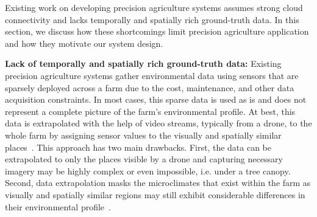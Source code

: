 Existing work on developing precision agriculture systems assumes strong cloud connectivity and lacks temporally and spatially rich ground-truth data. 
In this section, we discuss how these shortcomings limit precision agriculture application and how they motivate our system design. 


\noindent
\textbf{Lack of temporally and spatially rich ground-truth data:}
Existing precision agriculture systems gather environmental data using sensors that are sparsely deployed across a farm due to the cost, maintenance, and other data acquisition constraints. In most cases, this sparse data is used as is and  does not represent a complete picture of the farm's environmental profile.  At best, this data is extrapolated with the help of video streams, typically from a drone, to the whole farm by assigning sensor values to the visually and spatially similar places~\cite{vasisht2017farmbeats}. This approach has two main drawbacks. First, the data can be extrapolated to only the places visible by a drone and capturing necessary imagery may be highly complex or even impossible, i.e. under a tree canopy. Second, data extrapolation masks the microclimates that exist within the farm as visually and spatially similar regions may still exhibit considerable differences in their environmental profile~\cite{microclimates, microcolimate-effect, microclimate-specifics}. 


